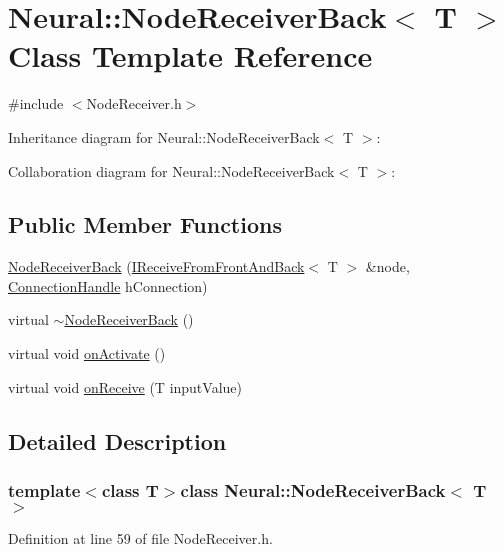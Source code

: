 \hypertarget{class_neural_1_1_node_receiver_back}{
\section{Neural::NodeReceiverBack$<$ T $>$ Class Template Reference}
\label{class_neural_1_1_node_receiver_back}
}


{\ttfamily \#include $<$NodeReceiver.h$>$}



Inheritance diagram for Neural::NodeReceiverBack$<$ T $>$:


Collaboration diagram for Neural::NodeReceiverBack$<$ T $>$:
\subsection*{Public Member Functions}
\begin{DoxyCompactItemize}
\item 
\hyperlink{class_neural_1_1_node_receiver_back_a5a06172b5e54818c137f9624828f14bd}{NodeReceiverBack} (\hyperlink{class_neural_1_1_i_receive_from_front_and_back}{IReceiveFromFrontAndBack}$<$ T $>$ \&node, \hyperlink{namespace_neural_a73b2763d14999ad4308dbf4246aa503f}{ConnectionHandle} hConnection)
\item 
virtual \hyperlink{class_neural_1_1_node_receiver_back_a40196b29b99b0b2efc76cdbfa9426634}{$\sim$NodeReceiverBack} ()
\item 
virtual void \hyperlink{class_neural_1_1_node_receiver_back_abf66db2577307ffececae63c7248bb5c}{onActivate} ()
\item 
virtual void \hyperlink{class_neural_1_1_node_receiver_back_add5216320f1d7f70b328f4ba298d0707}{onReceive} (T inputValue)
\end{DoxyCompactItemize}


\subsection{Detailed Description}
\subsubsection*{template$<$class T$>$class Neural::NodeReceiverBack$<$ T $>$}



Definition at line 59 of file NodeReceiver.h.



